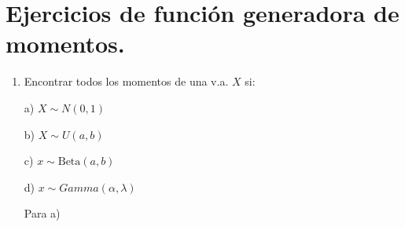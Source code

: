 \section{Ejercicios  de función generadora de momentos.}
\begin{enumerate}
\item Encontrar todos los momentos de una v.a. $X$ si:

\smallskip

a) $X\sim N \left(0,1 \right)$ 

\smallskip

b) $X \sim U \left(a,b \right)$

\smallskip

c) $x \sim \textrm{Beta} \left(a,b \right)$

\smallskip

d) $x\sim Gamma \left( \alpha, \lambda \right)$

\smallskip

Para a)


\end{enumerate}
